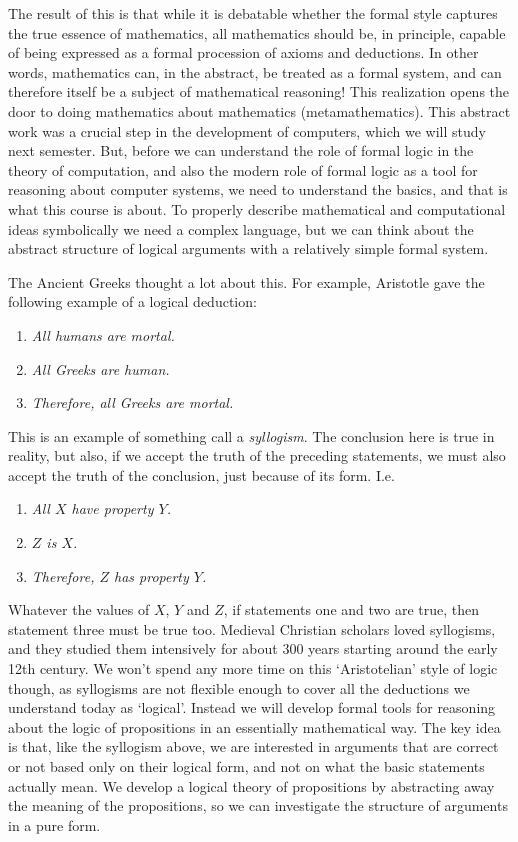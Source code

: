 \documentclass{article}
\theoremstyle{plain}
\begin{document}
The result of this is that while it is debatable whether the formal style captures the true essence of mathematics, all mathematics should be, in principle, capable of being expressed as a formal procession of axioms and deductions. In other words, mathematics can, in the abstract, be treated as a formal system, and can therefore itself be a subject of mathematical reasoning! This realization opens the door to doing mathematics about mathematics (metamathematics). This abstract work was a crucial step in the development of computers, which we will study next semester. But, before we can understand the role of formal logic in the theory of computation, and also the modern role of formal logic as a tool for reasoning about computer systems, we need to understand the basics, and that is what this course is about. To properly describe mathematical and computational ideas symbolically we need a complex language, but we can think about the abstract structure of logical arguments with a relatively simple formal system.

The Ancient Greeks thought a lot about this. For example, Aristotle gave the following example of a logical deduction: 
\begin{enumerate}
\item \emph{All humans are mortal.} 
\item\emph{All Greeks are human.}
\item\emph{Therefore, all Greeks are mortal.}
\end{enumerate}

This is an example of something call a \emph{syllogism}. The conclusion here is true in reality, but also, if we accept the truth of the preceding statements, we must also accept the truth of the conclusion, just because of its form. I.e.
\begin{enumerate}
\item \emph{All $X$ have property $Y$.} 
\item\emph{$Z$ is $X$.}
\item\emph{Therefore, $Z$ has property $Y$.}
\end{enumerate}

Whatever the values of $X$, $Y$ and $Z$, if statements one and two are true, then statement three must be true too. Medieval Christian scholars loved syllogisms, and they studied them intensively for about 300 years starting around the early 12th century.  We won't spend any more time on this `Aristotelian' style of logic though, as syllogisms are not flexible enough to cover all the deductions we understand today as `logical'. Instead we will develop formal tools for reasoning about the logic of propositions in an essentially mathematical way. The key idea is that, like the syllogism above, we are interested in arguments that are correct or not based only on their logical form, and not on what the basic statements actually mean. We develop a logical theory of propositions by abstracting away the meaning of the propositions, so we can investigate the structure of arguments in a pure form.  
\end{document}
